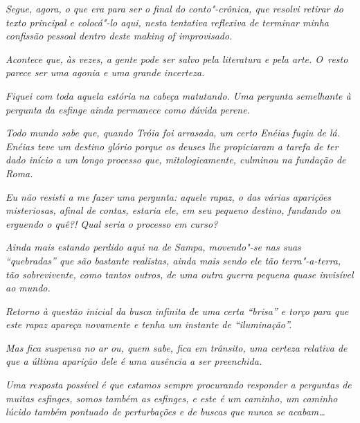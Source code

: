 \emph{\asterisc{}}

\emph{Segue, agora, o que era para ser o final do conto"-crônica, que
resolvi retirar do texto principal e colocá"-lo aqui, nesta tentativa
reflexiva de terminar minha confissão pessoal dentro deste making of
improvisado.}~

\emph{Acontece que, às vezes, a gente pode ser salvo pela literatura e
pela arte. O~resto parece ser uma agonia e uma grande incerteza.}~

\emph{Fiquei com toda aquela estória na cabeça matutando. Uma pergunta
semelhante à pergunta da esfinge ainda permanece como dúvida perene.}~

\emph{Todo mundo sabe que, quando Tróia foi arrasada, um certo Enéias
fugiu de lá. Enéias teve um destino glório porque os deuses lhe
propiciaram a tarefa de ter dado início a um longo processo que,
mitologicamente, culminou na fundação de Roma.}~

\emph{Eu não resisti a me fazer uma pergunta: aquele rapaz, o das várias
aparições misteriosas, afinal de contas, estaria ele, em seu pequeno
destino, fundando ou erguendo o quê?! Qual seria o processo em curso?}~

\emph{Ainda mais estando perdido aqui na  de Sampa, movendo"-se nas
suas ``quebradas'' que são bastante realistas, ainda mais sendo ele tão
terra"-a-terra, tão sobrevivente, como tantos outros, de uma outra guerra
pequena quase invisível ao mundo.}~

\emph{Retorno à questão inicial da busca infinita de uma certa ``brisa''
e torço para que este rapaz apareça novamente e tenha um instante de
``iluminação''.}~

\emph{Mas fica suspensa no ar ou, quem sabe, fica em trânsito, uma
certeza relativa de que a última aparição dele é uma ausência a ser
preenchida.}

\emph{Uma resposta possível é que estamos sempre procurando responder a
perguntas de muitas esfinges, somos também as esfinges, e este é um
caminho, um caminho lúcido também pontuado de perturbações e de buscas
que nunca se acabam…~}
